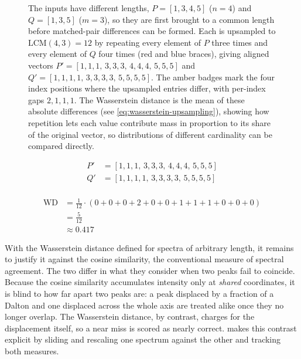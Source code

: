 \begin{figure}[H]
    \centering
    \resizebox{\textwidth}{!}{
        
    }
    \caption[Wasserstein Upsampling Illustration]{
        The inputs have different lengths, $P = [1,3,4,5]$ ($n=4$) and $Q = [1,3,5]$ ($m=3$), so they are first brought to a common length before matched-pair differences can be formed. 
        Each is upsampled to $\mathrm{LCM}(4,3) = 12$ by repeating every element of $P$ three times and every element of $Q$ four times (red and blue braces), giving aligned vectors $P' = [1,1,1,\,3,3,3,\,4,4,4,\,5,5,5]$ and $Q' = [1,1,1,1,\,3,3,3,3,\,5,5,5,5]$. 
        The amber badges mark the four index positions where the upsampled entries differ, with per-index gaps $2,1,1,1$.
        The Wasserstein distance is the mean of these absolute differences (see \cref{eq:wasserstein-upsampling}),
        showing how repetition lets each value contribute mass in proportion to its share of the original vector, so distributions of different cardinality can be compared directly.
    }
    \label{fig:wasserstein-upsampling-illustration}
\end{figure}

\begin{align*}
    P' &= [1,1,1,\,3,3,3,\,4,4,4,\,5,5,5]\\
    Q' &= [1,1,1,1,\,3,3,3,3,\,5,5,5,5]\\
\end{align*}

\begin{align}
    \label{eq:wasserstein-upsampling}
    \mathrm{WD} &= \tfrac{1}{12}\cdot(0+0+0+2+0+0+1+1+1+0+0+0) \\
                &= \tfrac{5}{12} \nonumber \\
                &\approx 0.417 \nonumber
\end{align}

With the Wasserstein distance defined for spectra of arbitrary length, it remains to justify it against the cosine similarity, the conventional measure of spectral agreement. 
The two differ in what they consider when two peaks fail to coincide.
Because the cosine similarity accumulates intensity only at \emph{shared} coordinates, it is blind to how far apart two peaks are: a peak displaced by a fraction of a Dalton and one displaced across the whole axis are treated alike once they no longer overlap. 
The Wasserstein distance, by contrast, charges for the displacement itself, so a near miss is scored as nearly correct.
 makes this contrast explicit by sliding and rescaling one spectrum against the other and tracking both measures.

